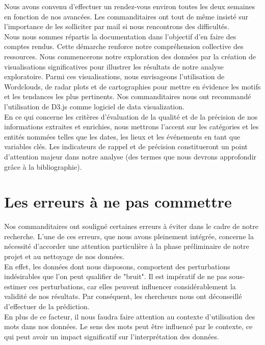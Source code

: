 \documentclass{article}
\begin{document}
Nous avons convenu d'effectuer un rendez-vous environ toutes les deux semaines en fonction de nos avancées. Les commanditaires ont tout de même insisté sur l'importance de les solliciter par mail si nous rencontrons des difficultés.\\

Nous nous sommes répartis la documentation dans l'objectif d'en faire des comptes rendus. Cette démarche renforce notre compréhension collective des ressources. Nous commencerons notre exploration des données par la création de visualisations significatives pour illustrer les résultats de notre analyse exploratoire. Parmi ces visualisations, nous envisageons l'utilisation de Wordclouds, de radar plots et de cartographies pour mettre en évidence les motifs et les tendances les plus pertinents. Nos commanditaires nous ont recommandé l'utilisation de D3.js comme logiciel de data visualization.\\

En ce qui concerne les critères d'évaluation de la qualité et de la précision de nos informations extraites et enrichies, nous mettrons l'accent sur les catégories et les entités nommées telles que les dates, les lieux et les événements en tant que variables clés. Les indicateurs de rappel et de précision constitueront un point d'attention majeur dans notre analyse (des termes que nous devrons approfondir grâce à la bibliographie).

\section{Les erreurs à ne pas commettre}
Nos commanditaires ont souligné certaines erreurs à éviter dans le cadre de notre recherche. L'une de ces erreurs, que nous avons pleinement intégrée, concerne la nécessité d'accorder une attention particulière à la phase préliminaire de notre projet et au nettoyage de nos données.\\

En effet, les données dont nous disposons, comportent des perturbations indésirables que l'on peut qualifier de "bruit". Il est impératif de ne pas sous-estimer ces perturbations, car elles peuvent influencer considérablement la validité de nos résultats. Par conséquent, les chercheurs nous ont déconseillé d'effectuer de la prédiction.\\

En plus de ce facteur, il nous faudra faire attention au contexte d'utilisation des mots dans nos données. Le sens des mots peut être influencé par le contexte, ce qui peut avoir un impact significatif sur l'interprétation des données. 
\end{document}
